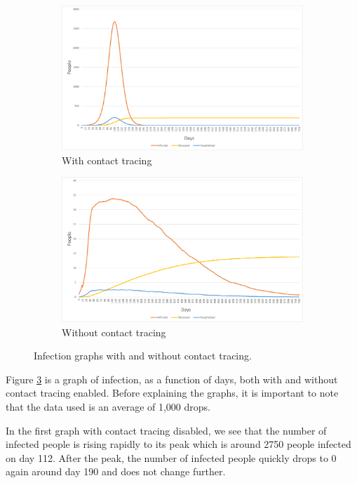 \begin{figure}[H]
 \centering
  \begin{subfigure}{.485\textwidth}
    \centering
    \includegraphics[width=.95\linewidth]{0_billeder/covidInfectionGraphA.png}
    \caption{With contact tracing}
    \label{Subfig:covidInfGraphA}
  \end{subfigure}
  \begin{subfigure}{.485\textwidth}
    \centering
    \includegraphics[width=.95\linewidth]{0_billeder/covidInfectionGraphB.png}
    \caption{Without contact tracing}
    \label{Subfig:covidInfGraphB}
  \end{subfigure}
 \caption{Infection graphs with and without contact tracing.}
 \label{Fig:covidInfGraphs}
\end{figure}

Figure \ref{Fig:covidInfGraphs} is a graph of infection, as a function of days, both with and without contact tracing enabled. Before explaining the graphs, it is important to note that the data used is an average of 1,000 drops.

In the first graph with contact tracing disabled, we see that the number of infected people is rising rapidly to its peak which is around 2750 people infected on day 112. After the peak, the number of infected people quickly drops to 0 again around day 190 and does not change further.


